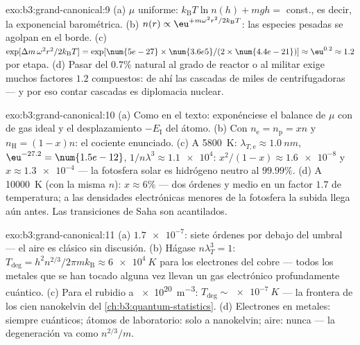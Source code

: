 \begin{solution}{exo:b3:grand-canonical:9}
(a) $\mu$ uniforme: $k_{\text{B}}T\ln n(h) + mgh = $ const., es decir,
la exponencial barométrica. (b) $n(r) \propto
\eu^{+m\omega^2r^2/2k_{\text{B}}T}$: las especies pesadas se agolpan en
el borde. (c) $\exp[\Delta m\,\omega^2r^2/2k_{\text{B}}T] =
\exp[\num{5e-27} \times \num{3.6e5}/(2 \times \num{4.4e-21})]
\approx \eu^{0.2} \approx 1.2$ por etapa. (d) Pasar del $0.7\%$
natural al grado de reactor o al militar exige muchos
factores $1.2$ compuestos: de ahí las cascadas de miles de
centrifugadoras --- y por eso contar cascadas es diplomacia nuclear.
\end{solution}

\begin{solution}{exo:b3:grand-canonical:10}
(a) Como en el texto: exponénciese el balance de $\mu$ con  de gas ideal y el desplazamiento $-E_{\text{I}}$ del átomo. (b)
Con $n_{\text{e}} = n_{\text{p}} = xn$ y $n_{\text{H}} =
(1-x)n$: el cociente enunciado. (c) A \qty{5800}{K}:
$\lambda_{T,\text{e}} \approx \qty{1.0}{nm}$,
$\eu^{-27.2} = \num{1.5e-12}$, $1/n\lambda^3 \approx \num{1.1e4}$:
$x^2/(1-x) \approx \num{1.6e-8}$ y $x \approx \num{1.3e-4}$ ---
la fotosfera solar es hidrógeno neutro al $99.99\%$. (d) A
\qty{10000}{K} (con la misma $n$): $x \approx 6\%$ --- dos órdenes y medio
en un factor $1.7$ de temperatura; a las densidades electrónicas
menores de la fotosfera la subida llega aún antes. Las transiciones de
Saha son acantilados.
\end{solution}

\begin{solution}{exo:b3:grand-canonical:11}
(a) $\num{1.7e-7}$: siete órdenes por debajo del umbral --- el aire es
clásico sin discusión. (b) Hágase $n\lambda_T^3 = 1$: $T_{\text{deg}} =
h^2n^{2/3}/2\pi mk_{\text{B}} \approx \qty{6e4}{K}$ para los electrones
del cobre --- todos los metales que se han tocado alguna vez llevan un gas
electrónico profundamente cuántico. (c) Para el rubidio a \qty{e20}{m^{-3}}:
$T_{\text{deg}} \sim \qty{e-7}{K}$ --- la frontera de los cien
nanokelvin del \cref{ch:b3:quantum-statistics}. (d) Electrones en
metales: siempre cuánticos; átomos de laboratorio: solo a nanokelvin;
aire: nunca --- la degeneración va como $n^{2/3}/m$.
\end{solution}

